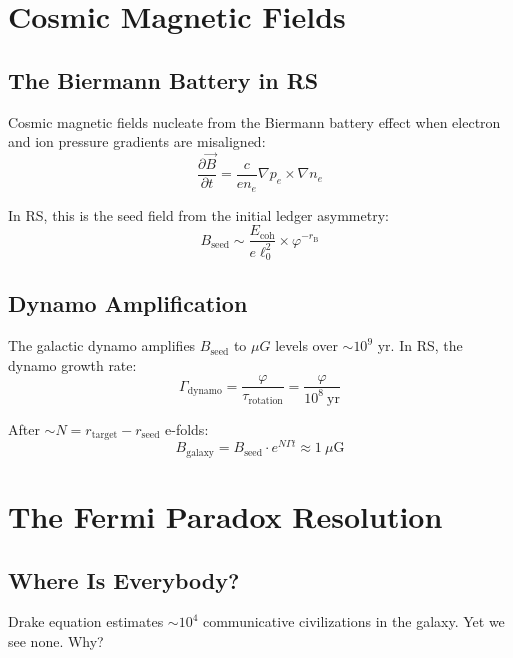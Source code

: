 \documentclass[12pt,a4paper]{article}
\theoremstyle{definition}
\theoremstyle{remark}
\begin{document}
\section{Cosmic Magnetic Fields}

\subsection{The Biermann Battery in RS}

Cosmic magnetic fields nucleate from the Biermann battery effect when electron and 
ion pressure gradients are misaligned:
\begin{equation}
\frac{\partial \vec{B}}{\partial t} = \frac{c}{e n_e} \nabla p_e \times \nabla n_e
\end{equation}

In RS, this is the seed field from the initial ledger asymmetry:
\begin{equation}
B_\mathrm{seed} \sim \frac{E_\mathrm{coh}}{e\ell_0^2} \times \varphi^{-r_\mathrm{B}}
\end{equation}

\subsection{Dynamo Amplification}

The galactic dynamo amplifies $B_\mathrm{seed}$ to $\mu G$ levels over $\sim 10^9$ yr.
In RS, the dynamo growth rate:
\begin{equation}
\Gamma_\mathrm{dynamo} = \frac{\varphi}{\tau_\mathrm{rotation}} = \frac{\varphi}{10^8~\mathrm{yr}}
\end{equation}

After $\sim N = r_\mathrm{target} - r_\mathrm{seed}$ e-folds:
\begin{equation}
B_\mathrm{galaxy} = B_\mathrm{seed} \cdot e^{N\Gamma t} \approx 1~\mu\mathrm{G}
\end{equation}

\section{The Fermi Paradox Resolution}

\subsection{Where Is Everybody?}

Drake equation estimates $\sim 10^4$ communicative civilizations in the galaxy.
Yet we see none. Why?
\end{document}
